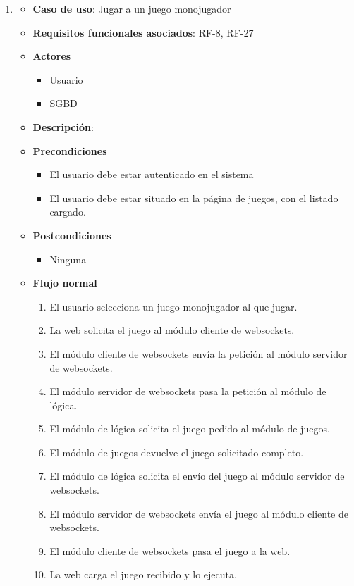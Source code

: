 \begin{enumerate}
\item %
  \begin{itemize}
  \item \textbf{Caso de uso}: Jugar a un juego monojugador
  \item \textbf{Requisitos funcionales asociados}: RF-8, RF-27
  \item \textbf{Actores}
    \begin{itemize}
    \item Usuario
    \item SGBD
    \end{itemize}
  \item \textbf{Descripción}: 
  \item \textbf{Precondiciones}
    \begin{itemize}
    \item El usuario debe estar autenticado en el sistema
    \item El usuario debe estar situado en la página de juegos, con el listado cargado.
    \end{itemize}
  \item \textbf{Postcondiciones}
    \begin{itemize}
    \item Ninguna
    \end{itemize}
  \item \textbf{Flujo normal}
    \begin{enumerate}
    \item El usuario selecciona un juego monojugador al que jugar.
    \item La web solicita el juego al módulo cliente de websockets.
    \item El módulo cliente de websockets envía la petición al módulo servidor de websockets.
    \item El módulo servidor de websockets pasa la petición al módulo de lógica.
    \item El módulo de lógica solicita el juego pedido al módulo de juegos.
    \item El módulo de juegos devuelve el juego solicitado completo.
    \item El módulo de lógica solicita el envío del juego al módulo servidor de websockets.
    \item El módulo servidor de websockets envía el juego al módulo cliente de websockets.
    \item El módulo cliente de websockets pasa el juego a la web.
    \item La web carga el juego recibido y lo ejecuta.

\end{enumerate}
\end{itemize}
\end{enumerate}
